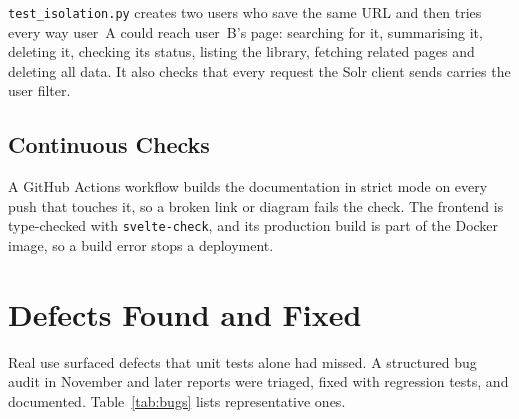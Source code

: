 \texttt{test\_isolation.py} creates two users who save the same URL and then
tries every way user~A could reach user~B's page: searching for it,
summarising it, deleting it, checking its status, listing the library,
fetching related pages and deleting all data. It also checks that every
request the Solr client sends carries the user filter.

\subsection{Continuous Checks}

A GitHub Actions workflow builds the documentation in strict mode on every
push that touches it, so a broken link or diagram fails the check. The
frontend is type-checked with \texttt{svelte-check}, and its production
build is part of the Docker image, so a build error stops a deployment.

\section{Defects Found and Fixed}

Real use surfaced defects that unit tests alone had missed. A structured bug
audit in November and later reports were triaged, fixed with regression
tests, and documented. Table~\ref{tab:bugs} lists representative ones.

